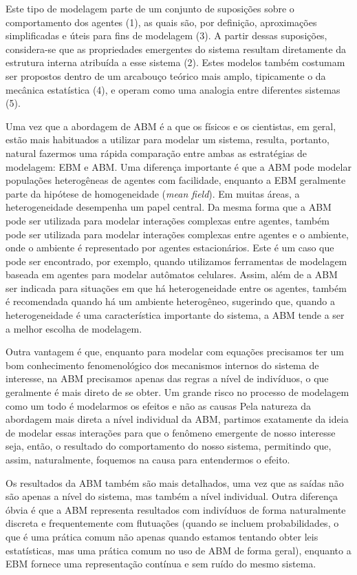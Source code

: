 Este tipo de modelagem parte de um conjunto de suposições sobre o comportamento dos agentes (1), as quais são, por definição, aproximações simplificadas e úteis para fins de modelagem (3). A partir dessas suposições, considera-se que as propriedades emergentes do sistema resultam diretamente da estrutura interna atribuída a esse sistema (2). Estes modelos também costumam ser propostos dentro de um arcabouço teórico mais amplo, tipicamente o da mecânica estatística (4), e operam como uma analogia entre diferentes sistemas (5).

Uma vez que a abordagem de ABM é a que os físicos e os cientistas, em geral, estão mais habituados a utilizar para modelar um sistema, resulta, portanto, natural fazermos uma rápida comparação entre ambas as estratégias de modelagem: EBM e ABM. Uma diferença importante é que a ABM pode modelar populações heterogêneas de agentes com facilidade, enquanto a EBM geralmente parte da hipótese de homogeneidade (\textit{mean field}). Em muitas áreas, a heterogeneidade desempenha um papel central. Da mesma forma que a ABM pode ser utilizada para modelar interações complexas entre agentes, também pode ser utilizada para modelar interações complexas entre agentes e o ambiente, onde o ambiente é representado por agentes estacionários. Este é um caso que pode ser encontrado, por exemplo, quando utilizamos ferramentas de modelagem baseada em agentes para modelar autômatos celulares. Assim, além de a ABM ser indicada para situações em que há heterogeneidade entre os agentes, também é recomendada quando há um ambiente heterogêneo, sugerindo que, quando a heterogeneidade é uma característica importante do sistema, a ABM tende a ser a melhor escolha de modelagem.

Outra vantagem é que, enquanto para modelar com equações precisamos ter um bom conhecimento fenomenológico dos mecanismos internos do sistema de interesse, na ABM precisamos apenas das regras a nível de indivíduos, o que geralmente é mais direto de se obter. Um grande risco no processo de modelagem como um todo é modelarmos os efeitos e não as causas %
 Pela natureza da abordagem mais direta a nível individual da ABM, partimos exatamente da ideia de modelar essas interações para que o fenômeno emergente de nosso interesse seja, então, o resultado do comportamento do nosso sistema, permitindo que, assim, naturalmente, foquemos na causa para entendermos o efeito. 

Os resultados da ABM também são mais detalhados, uma vez que as saídas não são apenas a nível do sistema, mas também a nível individual. Outra diferença óbvia é que a ABM representa resultados com indivíduos de forma naturalmente discreta e frequentemente com flutuações (quando se incluem probabilidades, o que é uma prática comum não apenas quando estamos  tentando obter leis estatísticas, mas uma prática comum no uso de ABM de forma geral), enquanto a EBM fornece uma representação contínua e sem ruído do mesmo sistema.

